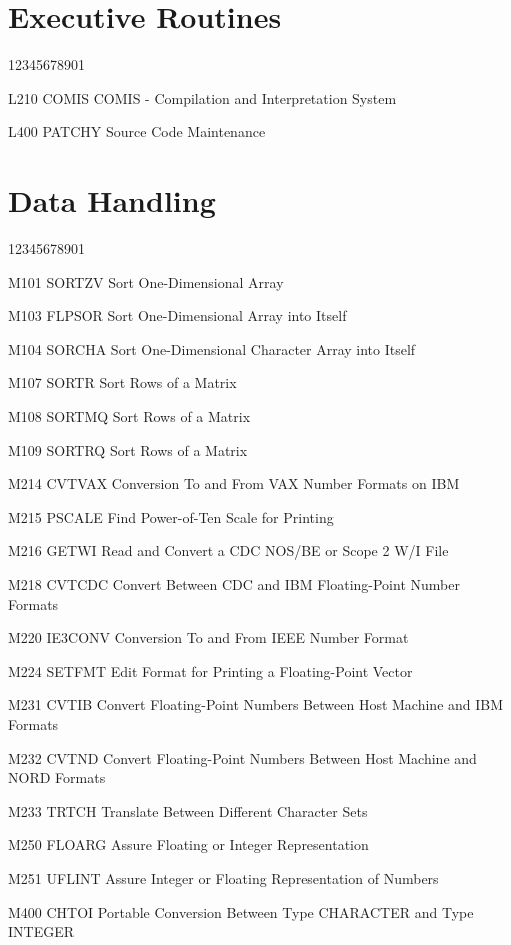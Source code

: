 \section*{Executive Routines}
\begin{DLtt}{12345678901}
\item[L210 COMIS] COMIS - Compilation and Interpretation System
\item[L400 PATCHY] Source Code Maintenance
\end{DLtt}
\section*{Data Handling}
\begin{DLtt}{12345678901}
\item[M101 SORTZV] Sort One-Dimensional Array
\item[M103 FLPSOR] Sort One-Dimensional Array into Itself
\item[M104 SORCHA] Sort One-Dimensional Character Array into Itself
\item[M107 SORTR] Sort Rows of a Matrix
\item[M108 SORTMQ] Sort Rows of a Matrix
\item[M109 SORTRQ] Sort Rows of a Matrix
\item[M214 CVTVAX] Conversion To and From VAX Number Formats on IBM
\item[M215 PSCALE] Find Power-of-Ten Scale for Printing
\item[M216 GETWI] Read and Convert a CDC NOS/BE or Scope 2 W/I File
\item[M218 CVTCDC] Convert Between CDC and IBM Floating-Point Number Formats
\item[M220 IE3CONV] Conversion To and From IEEE Number Format
\item[M224 SETFMT] Edit Format for Printing a Floating-Point Vector
\item[M231 CVTIB] Convert Floating-Point Numbers Between Host Machine and IBM Formats
\item[M232 CVTND] Convert Floating-Point Numbers Between Host Machine and NORD Formats
\item[M233 TRTCH] Translate Between Different Character Sets
\item[M250 FLOARG] Assure Floating or Integer Representation
\item[M251 UFLINT] Assure Integer or Floating Representation of Numbers
\item[M400 CHTOI] Portable Conversion Between Type CHARACTER and Type INTEGER

\end{DLtt}
